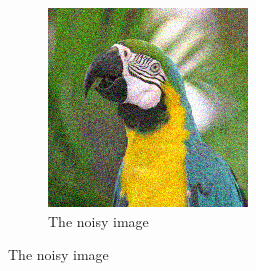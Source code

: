 \documentclass{article}
\begin{document}
\begin{figure}[htbp]
\begin{subfigure}[b]{0.24\textwidth}
        \includegraphics[width=\textwidth]{images/noisy_colour.png}
        \caption{The noisy image}
        \label{fig:noisy_colour}
    \end{subfigure}
    \vspace{.3cm}
    

\end{figure}
\end{document}
